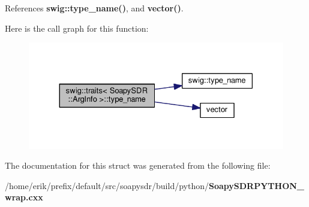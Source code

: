 References {\bf swig\+::type\+\_\+name()}, and {\bf vector()}.



Here is the call graph for this function\+:
\nopagebreak
\begin{figure}[H]
\begin{center}
\leavevmode
\includegraphics[width=330pt]{dc/d79/structswig_1_1traits_3_01SoapySDR_1_1ArgInfo_01_4_a0e09aee65d08a617befdd52fc8518e8b_cgraph}
\end{center}
\end{figure}




The documentation for this struct was generated from the following file\+:\begin{DoxyCompactItemize}
\item 
/home/erik/prefix/default/src/soapysdr/build/python/{\bf Soapy\+S\+D\+R\+P\+Y\+T\+H\+O\+N\+\_\+wrap.\+cxx}\end{DoxyCompactItemize}
